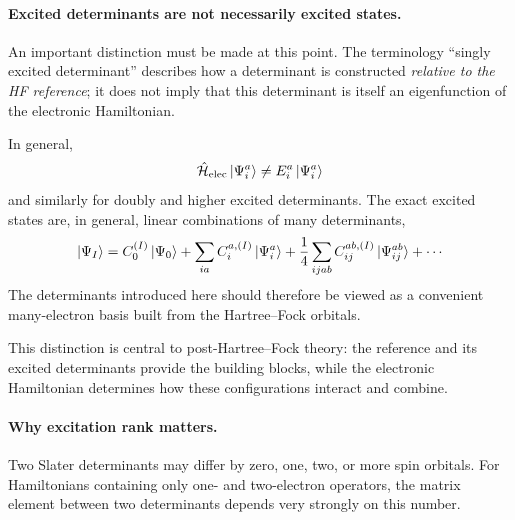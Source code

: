 \documentclass[11pt,a4paper,titlepage]{article}
\numberwithin{equation}{section}
\newcommand{\chH}{\Hat{\mathcal{H}}}
\begin{document}

\paragraph{Excited determinants are not necessarily excited states.}

An important distinction must be made at this point. The terminology
``singly excited determinant'' describes how a determinant is constructed
\emph{relative to the HF reference}; it does not imply that this determinant
is itself an eigenfunction of the electronic Hamiltonian.

In general,
\begin{equation}
  \chH_\text{elec}\ket*{\Psi_i^a}
  \neq
  E_i^a\ket*{\Psi_i^a}
\end{equation}
and similarly for doubly and higher excited determinants. The exact excited
states are, in general, linear combinations of many determinants,
\begin{equation}
  \ket*{\Psi_I}
  =
  C_0^{(I)}\ket{\Psi_0}
  +
  \sum_{ia}
  C_i^{a,(I)}
  \ket*{\Psi_i^a}
  +
  \frac{1}{4}
  \sum_{ijab}
  C_{ij}^{ab,(I)}
  \ket*{\Psi_{ij}^{ab}}
  +
  \cdots
\end{equation}
The determinants introduced here should therefore be viewed as a convenient
many-electron basis built from the Hartree--Fock orbitals.

This distinction is central to post-Hartree--Fock theory: the reference and
its excited determinants provide the building blocks, while the electronic
Hamiltonian determines how these configurations interact and combine.


\paragraph{Why excitation rank matters.}

Two Slater determinants may differ by zero, one, two, or more spin orbitals.
For Hamiltonians containing only one- and two-electron operators, the matrix
element between two determinants depends very strongly on this number.
\end{document}
